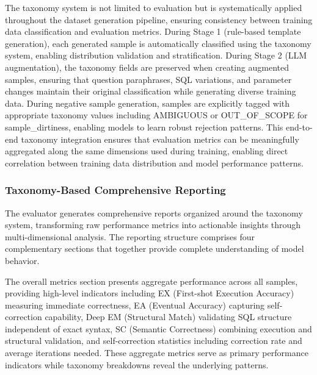 The taxonomy system is not limited to evaluation but is systematically applied throughout the dataset generation pipeline, ensuring consistency between training data classification and evaluation metrics. During Stage 1 (rule-based template generation), each generated sample is automatically classified using the taxonomy system, enabling distribution validation and stratification. During Stage 2 (LLM augmentation), the taxonomy fields are preserved when creating augmented samples, ensuring that question paraphrases, SQL variations, and parameter changes maintain their original classification while generating diverse training data. During negative sample generation, samples are explicitly tagged with appropriate taxonomy values including AMBIGUOUS or OUT\_OF\_SCOPE for sample\_dirtiness, enabling models to learn robust rejection patterns. This end-to-end taxonomy integration ensures that evaluation metrics can be meaningfully aggregated along the same dimensions used during training, enabling direct correlation between training data distribution and model performance patterns.

\subsubsection{Taxonomy-Based Comprehensive Reporting}

The evaluator generates comprehensive reports organized around the taxonomy system, transforming raw performance metrics into actionable insights through multi-dimensional analysis. The reporting structure comprises four complementary sections that together provide complete understanding of model behavior.

The overall metrics section presents aggregate performance across all samples, providing high-level indicators including EX (First-shot Execution Accuracy) measuring immediate correctness, EA (Eventual Accuracy) capturing self-correction capability, Deep EM (Structural Match) validating SQL structure independent of exact syntax, SC (Semantic Correctness) combining execution and structural validation, and self-correction statistics including correction rate and average iterations needed. These aggregate metrics serve as primary performance indicators while taxonomy breakdowns reveal the underlying patterns.

